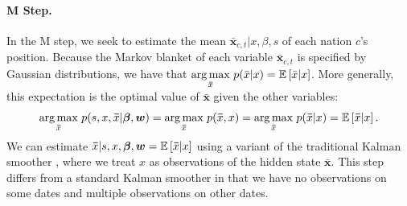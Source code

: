 \paragraph{M Step.} In the M step, we seek to estimate the mean $\bm
\bar x_{c,t} | x, \beta, s$ of each nation $c$'s position.  Because
the Markov blanket of each variable $\bm \bar x_{c,t}$ is specified by
Gaussian distributions, we have that $\underset{\bm \bar x} { \arg
  \max }\hspace{3pt} p( \bar x | x ) = \mathbb{E}\left[\bar x | x\right]$.  More
generally, this expectation is the optimal value of $\bm \bar x$ given
the other variables:
\begin{align}
  \underset{\bm \bar x} { \arg \max }\hspace{3pt} p(s, x, \bm \bar x |
  \bm \beta, \bm w)
  = \underset{\bm \bar x} { \arg \max }\hspace{3pt} p(\bm \bar x,  x )
  = \underset{\bm \bar x} { \arg \max }\hspace{3pt} p(\bm \bar x | x )
  = \mathbb{E}\left[\bm \bar x | x\right].
\end{align}
We can estimate $\bm \bar x | s, x, \bm \beta, \bm w = \mathbb{E}\left[\bm \bar x | x\right]$
using a variant of the traditional Kalman smoother
\citep{kalman:1960}, where we treat $x$ as observations of the hidden
state $\bm \bar x$.  This step differs from a standard Kalman smoother
in that we have no observations on some dates and multiple
observations on other dates.

